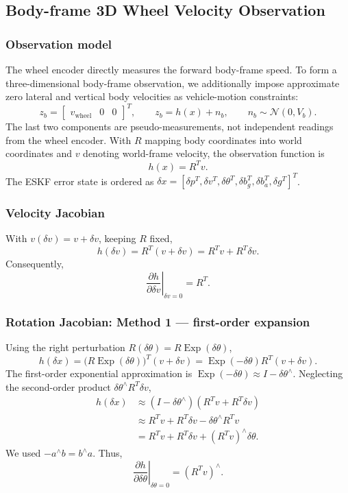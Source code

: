\documentclass[11pt]{article}
\numberwithin{equation}{section}
\newcommand{\Exp}{\operatorname{Exp}}
\begin{document}
\subsection{Body-frame 3D Wheel Velocity Observation}

\subsubsection*{Observation model}

The wheel encoder directly measures the forward body-frame speed. To form a
three-dimensional body-frame observation, we additionally impose approximate
zero lateral and vertical body velocities as vehicle-motion constraints:
\begin{equation}
\boxed{
 z_b=\begin{bmatrix}v_{\mathrm{wheel}}&0&0\end{bmatrix}^{T},
 \qquad z_b=h(x)+n_b,\qquad n_b\sim\mathcal N(0,V_b).
}
\end{equation}
The last two components are pseudo-measurements, not independent readings
from the wheel encoder. With $R$ mapping body coordinates into world
coordinates and $v$ denoting world-frame velocity, the observation function is
\begin{equation}
\boxed{h(x)=R^Tv.}
\end{equation}
The ESKF error state is ordered as
$\delta x=[\delta p^T,\delta v^T,\delta\theta^T,
\delta b_g^T,\delta b_a^T,\delta g^T]^T$.

\subsubsection*{Velocity Jacobian}

With $v(\delta v)=v+\delta v$, keeping $R$ fixed,
\[
 h(\delta v)=R^T(v+\delta v)=R^Tv+R^T\delta v.
\]
Consequently,
\begin{equation}
\boxed{\left.\frac{\partial h}{\partial\delta v}\right|_{\delta v=0}=R^T.}
\end{equation}

\subsubsection*{Rotation Jacobian: Method 1 --- first-order expansion}

Using the right perturbation $R(\delta\theta)=R\Exp(\delta\theta)$,
\[
 h(\delta x)
 =\bigl(R\Exp(\delta\theta)\bigr)^T(v+\delta v)
 =\Exp(-\delta\theta)R^T(v+\delta v).
\]
The first-order exponential approximation is
$\Exp(-\delta\theta)\approx I-\delta\theta^\wedge$.
Neglecting the second-order product $\delta\theta^\wedge R^T\delta v$,
\begin{align}
 h(\delta x)
 &\approx (I-\delta\theta^\wedge)(R^Tv+R^T\delta v)\\
 &\approx R^Tv+R^T\delta v-\delta\theta^\wedge R^Tv\\
 &=R^Tv+R^T\delta v+(R^Tv)^\wedge\delta\theta.
\end{align}
We used $-a^\wedge b=b^\wedge a$. Thus,
\begin{equation}
\boxed{
\left.\frac{\partial h}{\partial\delta\theta}\right|_{\delta\theta=0}
 =(R^Tv)^\wedge.
}
\end{equation}
\end{document}
